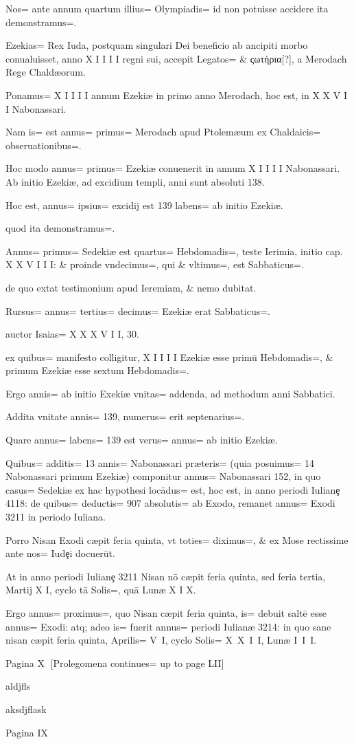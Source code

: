 \begin{parnumbers}
Nos= ante annum quartum illius= Olympiadis= id non potuisse accidere ita demonstramus=. 

Ezekias= Rex Iuda, postquam singulari Dei beneficio ab ancipiti morbo conualuisset, anno X I I I I regni sui, accepit Legatos= \& ςωτήρια[?], a Merodach Rege Chaldæorum.

Ponamus= X I I I I annum Ezekiæ in primo anno Merodach, hoc est, in X X V I I Nabonassari.

Nam is= est annus= primus= Merodach apud Ptolemæum ex Chaldaicis= obseruationibus=. 

Hoc modo annus= primus= Ezekiæ conuenerit in annum X I I I I Nabonassari. Ab initio Ezekiæ, ad excidium templi, anni sunt absoluti 138.

Hoc est, annus= ipsius= excidij est 139 labens= ab initio Ezekiæ.

quod ita demonstramus=. 

Annus= primus= Sedekiæ est quartus= Hebdomadis=, teste Ierimia, initio cap. X X V I I I: \& proinde vndecimus=, qui \& vltimus=, est Sabbaticus=. 

de quo extat testimonium apud Ieremiam, \& nemo dubitat.

Rursus= annus= tertius= decimus= Ezekiæ erat Sabbaticus=. 

auctor Isaias= X X X V I I, 30.

ex quibus= manifesto colligitur, X I I I I Ezekiæ esse primū Hebdomadis=, \& primum Ezekiæ esse sextum Hebdomadis=. 

Ergo annis= ab initio Exekiæ vnitas= addenda, ad methodum anni Sabbatici.

Addita vnitate annis= 139, numerus= erit septenarius=. 

Quare annus= labens= 139 est verus= annus= ab initio Ezekiæ.

Quibus= additis= 13 annis= Nabonassari præteris= (quia posuimus= 14 Nabonassari primum Ezekiæ) componitur annus= Nabonassari 152, in quo casus= Sedekiæ ex hac hypothesi locādus= est, hoc est, in anno periodi Iulianȩ 4118: de quibus= deductis= 907 absolutis= ab Exodo, remanet annus= Exodi 3211 in periodo Iuliana.

Porro Nisan Exodi cæpit feria quinta, vt toties= diximus=, \& ex Mose rectissime ante nos= Iudȩi docuerūt.

At in anno periodi Iulianȩ 3211 Nisan nō cæpit feria quinta, sed feria tertia, Martij X I, cyclo tā Solis=, quā Lunæ X I X.

Ergo annus= proximus=, quo Nisan cæpit feria quinta, is= debuit saltē esse annus= Exodi: atq; adeo is= fuerit annus= periodi Iulianæ 3214: in quo sane nisan cæpit feria quinta, Aprilis= V I, cyclo Solis= X X I I, Lunæ I I I.

Pagina X
[Prolegomena continues= up to page LII]

aldjfls

aksdjflask

Pagina IX\end{parnumbers}
